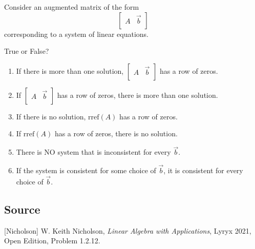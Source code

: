 \documentclass{ximera}
\author{}
\begin{document}
\begin{exercise}
Consider an augmented matrix of the form
$$\left[\begin{array}{c|c} 
 A & \vec{b}\\
 \end{array}\right]$$
 corresponding to a system of linear equations.

 True or False?

 \begin{enumerate}
     \item If there is more than one solution, $\left[\begin{array}{c|c} 
 A & \vec{b}\\
 \end{array}\right]$ has a row of zeros.

 \begin{multipleChoice}
 \end{multipleChoice}

 \item If $\left[\begin{array}{c|c} 
 A & \vec{b}\\
 \end{array}\right]$ has a row of zeros, there is more than one solution.

 \begin{multipleChoice}
 \end{multipleChoice}

 \item If there is no solution, $\mbox{rref}(A)$ has a row of zeros.

 \begin{multipleChoice}
 \end{multipleChoice}

 \item If $\mbox{rref}(A)$ has a row of zeros, there is no solution.

 \begin{multipleChoice}
 \end{multipleChoice}

 \item There is NO system that is inconsistent for every $\vec{b}$.

 \begin{multipleChoice}
 \end{multipleChoice}

 \item If the system is consistent for some choice of $\vec{b}$, it is consistent for every choice of $\vec{b}$.

 \begin{multipleChoice}
 \end{multipleChoice}
 \end{enumerate}

 
\end{exercise}

\subsection*{Source}
[Nicholson] W. Keith Nicholson, {\it Linear Algebra with Applications}, Lyryx 2021, Open Edition, Problem 1.2.12.
\end{document}
